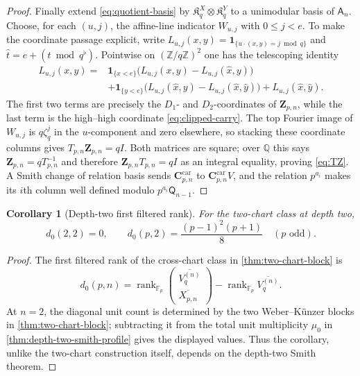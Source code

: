 \documentclass[12pt,a4paper]{article}
\newtheorem{corollary}[theorem]{Corollary}
\theoremstyle{definition}
\newcommand{\Z}{\mathbb Z}
\newcommand{\Q}{\mathbb Q}
\newcommand{\F}{\mathbb F}
\newcommand{\A}{\mathsf A}
\newcommand{\QQ}{\mathsf Q}
\newcommand{\rank}{\operatorname{rank}}
\begin{document}
\begin{proof}
Finally extend \eqref{eq:quotient-basis} by
$\mathfrak K_q^X\otimes\mathfrak K_q^Y$ to a unimodular basis of $\A_n$.
Choose, for each $(u,j)$, the affine-line indicator
$W_{u,j}$ with $0\leq j<e$.  To make the coordinate passage explicit, write
$L_{u,j}(x,y)=\mathbf1_{\{u\cdot(x,y)=j\bmod q\}}$ and
$\widehat t=e+(t\bmod q^\flat)$.  Pointwise on $(\Z/q\Z)^2$ one has the
telescoping identity
\[
\begin{split}
L_{u,j}(x,y)={}&\mathbf1_{\{x<e\}}
  \bigl(L_{u,j}(x,y)-L_{u,j}(\widehat x,y)\bigr)\\
&+\mathbf1_{\{y<e\}}
  \bigl(L_{u,j}(\widehat x,y)-L_{u,j}(\widehat x,\widehat y)\bigr)
  +L_{u,j}(\widehat x,\widehat y).
\end{split}
\]
The first two terms are precisely the $D_1$- and $D_2$-coordinates of
$\mathbf Z_{p,n}$, while the last term is the high--high coordinate
\eqref{eq:clipped-carry}.  The top Fourier image of $W_{u,j}$ is
$q\zeta_q^j$ in the $u$-component and zero elsewhere, so stacking these
coordinate columns gives $T_{p,n}\mathbf Z_{p,n}=qI$.  Both matrices are
square; over $\Q$ this says $\mathbf Z_{p,n}=qT_{p,n}^{-1}$ and therefore
$\mathbf Z_{p,n}T_{p,n}=qI$ as an integral equality, proving
\eqref{eq:TZ}.  A Smith change of relation basis sends
$\mathbf C^{\mathrm{car}}_{p,n}$ to $\mathbf C^{\mathrm{car}}_{p,n}V$, and
the relation $p^{a_i}$ makes its $i$th column well defined modulo
$p^{a_i}\QQ_{n-1}$.
\end{proof}

\begin{corollary}[Depth-two first filtered rank]
\label{cor:depth-two-filtered-rank}
For the two-chart class at depth two,
\[
 d_0(2,2)=0,
 \qquad d_0(p,2)=\frac{(p-1)^2(p+1)}8\quad(p\text{ odd}).
\]
\end{corollary}

\begin{proof}
The first filtered rank of the cross-chart class in
\cref{thm:two-chart-block} is
\[
 d_0(p,n)=\rank_{\F_p}
 \begin{pmatrix}\overline{V_q^{(n)}}\\\overline{X_{p,n}}\end{pmatrix}
 -\rank_{\F_p}\overline{V_q^{(n)}}.
\]
At $n=2$, the diagonal unit count is determined by the two
Weber--K\"unzer blocks in \cref{thm:two-chart-block}; subtracting it from the total
unit multiplicity $\mu_0$ in \cref{thm:depth-two-smith-profile} gives the displayed values.
Thus the corollary, unlike the two-chart construction itself, depends on the
depth-two Smith theorem.
\end{proof}
\end{document}
